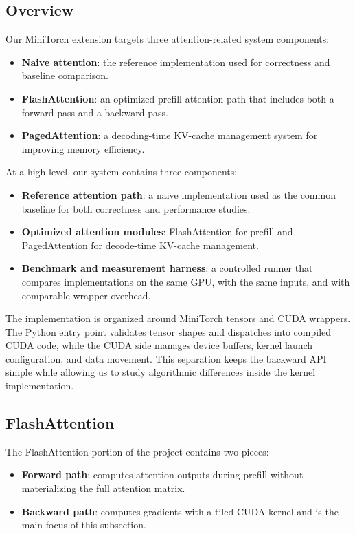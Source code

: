 \documentclass{article}
\begin{document}
\subsection{Overview}

Our MiniTorch extension targets three attention-related system components:
\begin{itemize}
    \item \textbf{Naive attention}: the reference implementation used for correctness and baseline comparison.
    \item \textbf{FlashAttention}: an optimized prefill attention path that includes both a forward pass and a backward pass.
    \item \textbf{PagedAttention}: a decoding-time KV-cache management system for improving memory efficiency.
\end{itemize}



At a high level, our system contains three components:
\begin{itemize}
    \item \textbf{Reference attention path}: a naive implementation used as the common baseline for both correctness and performance studies.
    \item \textbf{Optimized attention modules}: FlashAttention for prefill and PagedAttention for decode-time KV-cache management.
    \item \textbf{Benchmark and measurement harness}: a controlled runner that compares implementations on the same GPU, with the same inputs, and with comparable wrapper overhead.
\end{itemize}

The implementation is organized around MiniTorch tensors and CUDA wrappers. The Python entry point validates tensor shapes and dispatches into compiled CUDA code, while the CUDA side manages device buffers, kernel launch configuration, and data movement. This separation keeps the backward API simple while allowing us to study algorithmic differences inside the kernel implementation.

\subsection{FlashAttention}

The FlashAttention portion of the project contains two pieces:
\begin{itemize}
    \item \textbf{Forward path}: computes attention outputs during prefill without materializing the full attention matrix.
    \item \textbf{Backward path}: computes gradients with a tiled CUDA kernel and is the main focus of this subsection.
\end{itemize}
\end{document}
